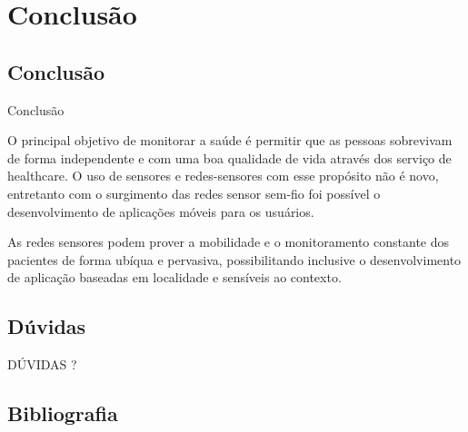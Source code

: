 \documentclass{beamer}
\begin{document}
\section{Conclusão}
\subsection{Conclusão}
\begin{frame}{Conclusão}
  \begin{block}{}
    O principal objetivo de monitorar a saúde é permitir que as pessoas sobrevivam de forma independente e com uma boa qualidade de vida através dos serviço de healthcare. O uso de sensores e redes-sensores com esse propósito não é novo, entretanto com o surgimento das redes sensor sem-fio foi possível o desenvolvimento de aplicações móveis para os usuários.
  \end{block}

  \begin{block}{}
   As redes sensores podem prover a mobilidade e o monitoramento constante dos pacientes de forma ubíqua e pervasiva, possibilitando inclusive o desenvolvimento de aplicação baseadas em localidade e sensíveis ao contexto.
  \end{block}
\end{frame}


\subsection{Dúvidas}
\begin{frame}
  \begin{center}
  DÚVIDAS ?
  \end{center}
\end{frame}

\subsection{Bibliografia}

\end{document}

